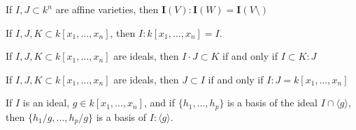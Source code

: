                 \begin{theorem}
                    If $I,J\subset k^n$ are affine varieties,
                    then $\textbf{I}(V):\textbf{I}(W)=\textbf{I}(V\setminus)$
                \end{theorem}
                \begin{theorem}
                    If $I,J,K\subset k[x_1,\hdots ,x_n]$,
                    then $I:k[x_1,\hdots ,x_n]=I$.
                \end{theorem}
                \begin{theorem}
                    If $I,J,K \subset k[x_1,\hdots ,x_n]$ are ideals,
                    then $I\cdot J\subset K$ if and only if $I\subset K:J$
                \end{theorem}
                \begin{theorem}
                    If $I,J,K\subset k[x_1,\hdots ,x_n]$ are ideals,
                    then $J\subset I$ if and only if
                    $I:J=k[x_1,\hdots ,x_n]$
                \end{theorem}
                \begin{theorem}
                    If $I$ is an ideal, $g\in k[x_1,\hdots ,x_n]$,
                    and if $\{h_1,\hdots, h_p\}$ is a basis of the
                    ideal $I\cap \langle g \rangle$, then
                    $\{h_1/g,\hdots, h_p/g\}$ is a basis of
                    $I:\langle g\rangle$.
                \end{theorem}
